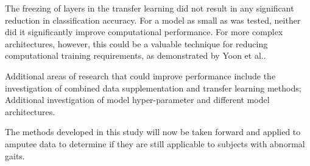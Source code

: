 The freezing of layers in the transfer learning did not result in any significant reduction in classification accuracy. For a model as small as was tested, neither did it significantly improve computational performance. For more complex architectures, however, this could be a valuable technique for reducing computational training requirements, as demonstrated by Yoon et al.\cite{Yoon2017}.

Additional areas of research that could improve performance include the investigation of combined data supplementation and transfer learning methods; Additional investigation of model hyper-parameter and different model architectures.

The methods developed in this study will now be taken forward and applied to amputee data to determine if they are still applicable to subjects with abnormal gaits.